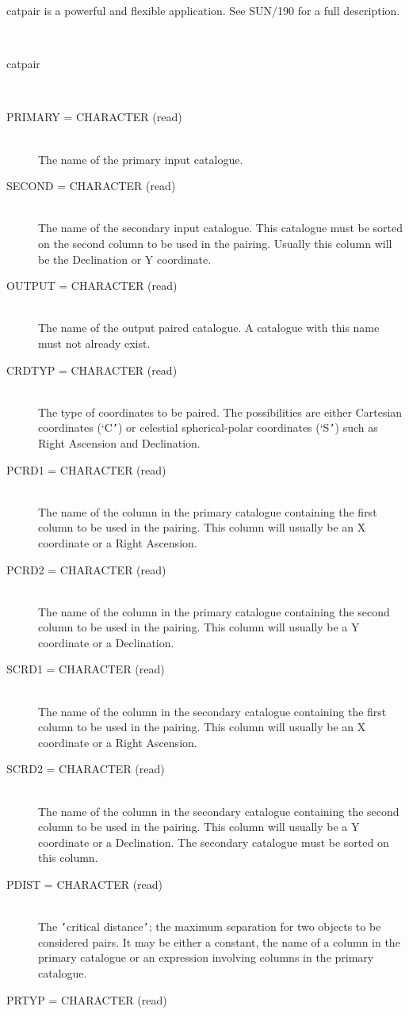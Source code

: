 \documentclass[twoside,11pt]{article}
\renewcommand{\_}{\texttt{\symbol{95}}}
\newcommand{\sstusage}[1]{\item[Usage:] \mbox{}
\\[1.3ex]{\raggedright \ssttt #1}}
\newcommand{\sstparameters}[1]{
   \item[Parameters:] \mbox{} \\
   \vspace{-3.5ex}
   \begin{description}
      #1
   \end{description}
}
\newcommand{\sstsubsection}[1]{ \item[{#1}] \mbox{} \\}
\newcommand{\sstusage}[1]{\item[Usage:]
      \begin{description}
         {\ssttt #1}
      \end{description}
      \\
   }
\newcommand{\sstparameters}[1]{
      \item[Parameters:] \\
      \begin{description}
         #1
      \end{description}
      \\
   }
\newcommand{\sstsubsection}[1]{\item[{#1}]}
\begin{document}
\begin{htmlonly}
{{      catpair is a powerful and flexible application.  See SUN/190 for
      a full description.
   }
   \sstusage{
      catpair
   }
   \sstparameters{
      \sstsubsection{
         PRIMARY  =  CHARACTER (read)
      }{
         The name of the primary input catalogue.
      }
      \sstsubsection{
         SECOND  =  CHARACTER (read)
      }{
         The name of the secondary input catalogue.  This catalogue
         must be sorted on the second column to be used in the pairing.
         Usually this column will be the Declination or Y coordinate.
      }
      \sstsubsection{
         OUTPUT  =  CHARACTER (read)
      }{
         The name of the output paired catalogue.  A catalogue with
         this name must not already exist.
      }
      \sstsubsection{
         CRDTYP  =  CHARACTER (read)
      }{
         The type of coordinates to be paired.  The possibilities are
         either Cartesian coordinates (`C{\tt '}) or celestial spherical-polar
         coordinates (`S{\tt '}) such as Right Ascension and Declination.
      }
      \sstsubsection{
         PCRD1  =  CHARACTER (read)
      }{
         The name of the column in the primary catalogue containing the
         first column to be used in the pairing. This column will usually
         be an X coordinate or a Right Ascension.
      }
      \sstsubsection{
         PCRD2  =  CHARACTER (read)
      }{
         The name of the column in the primary catalogue containing the
         second column to be used in the pairing. This column will usually
         be a Y coordinate or a Declination.
      }
      \sstsubsection{
         SCRD1  =  CHARACTER (read)
      }{
         The name of the column in the secondary catalogue containing the
         first column to be used in the pairing. This column will usually
         be an X coordinate or a Right Ascension.
      }
      \sstsubsection{
         SCRD2  =  CHARACTER (read)
      }{
         The name of the column in the secondary catalogue containing the
         second column to be used in the pairing. This column will usually
         be a Y coordinate or a Declination. The secondary catalogue must
         be sorted on this column.
      }
      \sstsubsection{
         PDIST  =  CHARACTER (read)
      }{
         The {\tt '}critical distance{\tt '}; the maximum separation for two objects
         to be considered pairs.  It may be either a constant, the
         name of a column in the primary catalogue or an expression
         involving columns in the primary catalogue.
      }
      \sstsubsection{
         PRTYP  =  CHARACTER (read)
}}}
\end{htmlonly}
\end{document}
